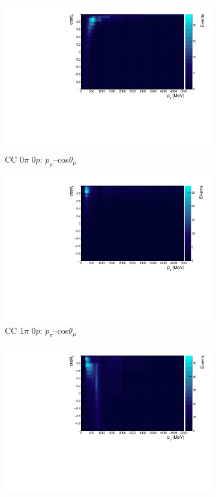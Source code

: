 \begin{figure}
\centering
\begin{subfigure}{.49\textwidth}
  \centering
  \includegraphics[width=0.9\linewidth]{figs/hptpc_sigvar_cc0pi0p.pdf}
  \caption{CC 0$\pi$ $0p$: $p_{\mu}$--cos$\theta_{\mu}$}
\end{subfigure}
\begin{subfigure}{.49\textwidth}
  \centering
  \includegraphics[width=0.9\linewidth]{figs/hptpc_sigvar_cc1pi0p.pdf}
  \caption{CC 1$\pi$ $0p$: $p_{\pi}$--cos$\theta_{\mu}$}
\end{subfigure}
\begin{subfigure}{.49\textwidth}
  \centering
  \includegraphics[width=0.9\linewidth]{figs/hptpc_sigvar_cc0pi1p.pdf}

\end{subfigure}
\end{figure}
